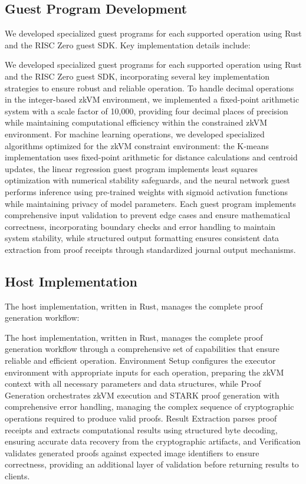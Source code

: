 \documentclass[11pt]{article}
\begin{document}
\subsection{Guest Program Development}

We developed specialized guest programs for each supported operation using Rust and the RISC Zero guest SDK. Key implementation details include:

We developed specialized guest programs for each supported operation using Rust and the RISC Zero guest SDK, incorporating several key implementation strategies to ensure robust and reliable operation. To handle decimal operations in the integer-based zkVM environment, we implemented a fixed-point arithmetic system with a scale factor of 10,000, providing four decimal places of precision while maintaining computational efficiency within the constrained zkVM environment. For machine learning operations, we developed specialized algorithms optimized for the zkVM constraint environment: the K-means implementation uses fixed-point arithmetic for distance calculations and centroid updates, the linear regression guest program implements least squares optimization with numerical stability safeguards, and the neural network guest performs inference using pre-trained weights with sigmoid activation functions while maintaining privacy of model parameters. Each guest program implements comprehensive input validation to prevent edge cases and ensure mathematical correctness, incorporating boundary checks and error handling to maintain system stability, while structured output formatting ensures consistent data extraction from proof receipts through standardized journal output mechanisms.

\subsection{Host Implementation}

The host implementation, written in Rust, manages the complete proof generation workflow:

The host implementation, written in Rust, manages the complete proof generation workflow through a comprehensive set of capabilities that ensure reliable and efficient operation. Environment Setup configures the executor environment with appropriate inputs for each operation, preparing the zkVM context with all necessary parameters and data structures, while Proof Generation orchestrates zkVM execution and STARK proof generation with comprehensive error handling, managing the complex sequence of cryptographic operations required to produce valid proofs. Result Extraction parses proof receipts and extracts computational results using structured byte decoding, ensuring accurate data recovery from the cryptographic artifacts, and Verification validates generated proofs against expected image identifiers to ensure correctness, providing an additional layer of validation before returning results to clients.
\end{document}

